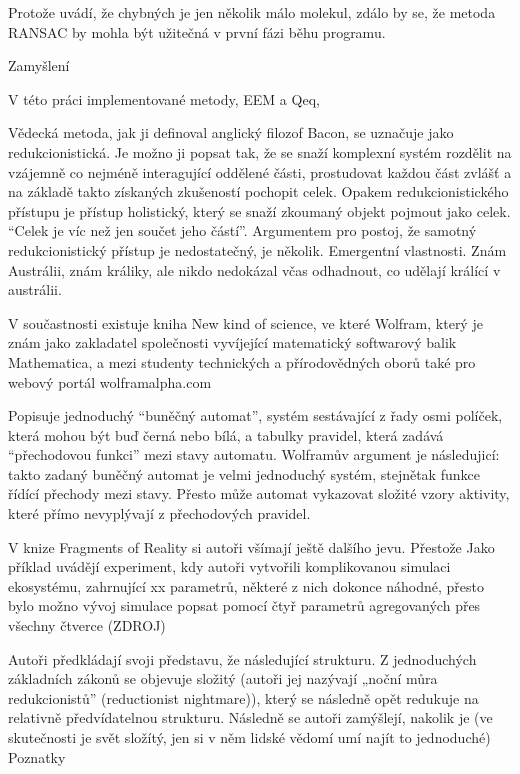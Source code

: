 \documentclass[
  color, %
  table, %
  lof,   %
  lot,   %
]{fithesis3}
\begin{document}
Protože uvádí, že chybných je jen několik málo molekul, zdálo by se, že metoda RANSAC by mohla být užitečná v první fázi běhu programu.




Zamyšlení

V této práci implementované metody, EEM a Qeq, 

Vědecká metoda, jak ji definoval anglický filozof Bacon, se uznačuje jako redukcionistická. Je možno ji popsat tak, že se snaží komplexní systém rozdělit na vzájemně co nejméně interagující oddělené části, prostudovat každou část zvlášť a na základě takto získaných zkušeností pochopit celek. Opakem redukcionistického přístupu je přístup holistický, který se snaží zkoumaný objekt pojmout jako celek. “Celek je víc než jen součet jeho částí”. Argumentem pro postoj, že samotný redukcionistický přístup je nedostatečný, je několik. Emergentní vlastnosti. Znám Austrálii, znám králiky, ale nikdo nedokázal včas odhadnout, co udělají králící v austrálii.

V součastnosti existuje kniha New kind of science, ve které Wolfram, který je znám jako zakladatel společnosti vyvíjející matematický softwarový balik Mathematica, a mezi studenty technických a přírodovědných oborů také pro webový portál wolframalpha.com

Popisuje jednoduchý “buněčný automat”, systém sestávající z řady osmi políček, která mohou být buď černá nebo bílá, a tabulky pravidel, která zadává “přechodovou funkci” mezi stavy automatu. Wolframův argument je následujicí: takto zadaný buněčný automat je velmi jednoduchý systém, stejnětak funkce řídící přechody mezi stavy. Přesto může automat vykazovat složité vzory aktivity, které přímo nevyplývají z přechodových pravidel.

V knize Fragments of Reality si autoři všímají ještě dalšího jevu. Přestože Jako příklad uvádějí experiment, kdy autoři vytvořili komplikovanou simulaci ekosystému, zahrnující xx parametrů, některé z nich dokonce náhodné, přesto bylo možno vývoj simulace popsat pomocí čtyř parametrů agregovaných přes všechny čtverce (ZDROJ) 

Autoři předkládají svoji představu, že následující strukturu. Z jednoduchých základních zákonů se objevuje složitý (autoři jej nazývají „noční můra redukcionistů” (reductionist nightmare)), který se následně opět redukuje na relativně předvídatelnou strukturu. Následně se autoři zamýšlejí, nakolik je (ve skutečnosti je svět složítý, jen si v něm lidské vědomí umí najít to jednoduché)
Poznatky
\end{document}
